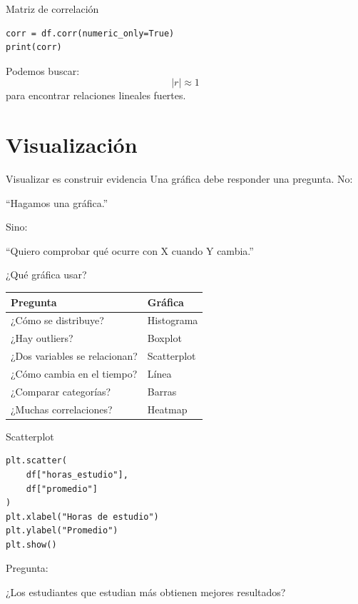 \documentclass[aspectratio=169,11pt]{beamer}
\begin{document}
\begin{frame}[fragile]{Matriz de correlación}
\begin{lstlisting}
corr = df.corr(numeric_only=True)
print(corr)
\end{lstlisting}
Podemos buscar:
\[
|r| \approx 1
\]
para encontrar relaciones lineales fuertes.
\end{frame}
\section{Visualización}
\begin{frame}{Visualizar es construir evidencia}
Una gráfica debe responder una pregunta.
No:
\begin{center}
``Hagamos una gráfica.''
\end{center}
Sino:
\begin{center}
``Quiero comprobar qué ocurre con X cuando Y cambia.''
\end{center}
\end{frame}
\begin{frame}{¿Qué gráfica usar?}
\begin{tabular}{ll}
\toprule
Pregunta & Gráfica\\
\midrule
¿Cómo se distribuye? & Histograma\\
¿Hay outliers? & Boxplot\\
¿Dos variables se relacionan? & Scatterplot\\
¿Cómo cambia en el tiempo? & Línea\\
¿Comparar categorías? & Barras\\
¿Muchas correlaciones? & Heatmap\\
\bottomrule
\end{tabular}
\end{frame}
\begin{frame}[fragile]{Scatterplot}
\begin{lstlisting}
plt.scatter(
    df["horas_estudio"],
    df["promedio"]
)
plt.xlabel("Horas de estudio")
plt.ylabel("Promedio")
plt.show()
\end{lstlisting}
Pregunta:
\begin{center}
¿Los estudiantes que estudian más obtienen mejores resultados?
\end{center}
\end{frame}
\end{document}
